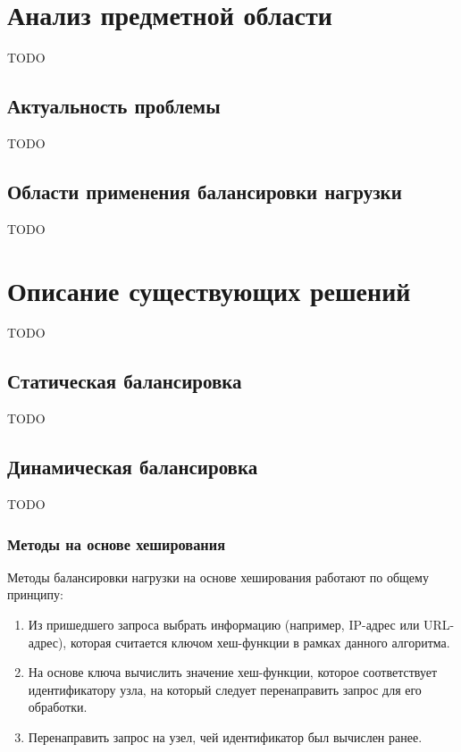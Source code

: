 \section{Анализ предметной области}

TODO

\subsection{Актуальность проблемы}

TODO

\subsection{Области применения балансировки нагрузки}

TODO

\section{Описание существующих решений}

TODO

\subsection{Статическая балансировка}

TODO

\subsection{Динамическая балансировка}

TODO


\subsubsection{Методы на основе хеширования}

Методы балансировки нагрузки на основе хеширования работают по общему принципу:
\begin{enumerate}
    \item Из пришедшего запроса выбрать информацию (например, IP-адрес или URL-адрес), которая считается ключом хеш-функции в рамках данного алгоритма.
    \item На основе ключа вычислить значение хеш-функции, которое соответствует идентификатору узла, на который следует перенаправить запрос для его обработки.
    \item Перенаправить запрос на узел, чей идентификатор был вычислен ранее.
\end{enumerate}


